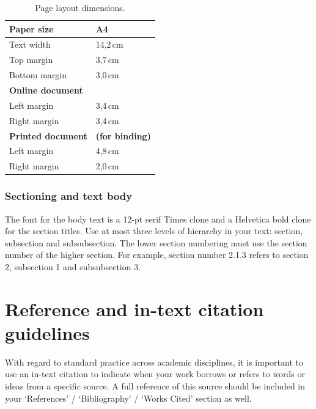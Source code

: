 \documentclass[english, 12pt, a4paper, elec, utf8, a-2b, online]{aaltothesis}
\begin{document}
\begin{table}[htb]
	\centering
	\caption{Page layout dimensions.}
	\label{tab:layout}
	\sffamily%
	\begin{tabular}{ll}
		\hline
		Paper size & A4\\\hline
		Text width & 14,2\,cm \\\hline
		Top margin & 3,7\,cm \\\hline
		Bottom margin & 3,0\,cm \\\hline
		\textbf{Online document} & \\\hline
		Left margin & 3,4\,cm \\\hline
		Right margin & 3,4\,cm \\\hline
		\textbf{Printed document} & \textbf{(for binding)} \\\hline
		Left margin & 4,8\,cm \\\hline
		Right margin & 2,0\,cm \\\hline
	\end{tabular}
\end{table}


\subsubsection*{Sectioning and text body}

The font for the body text is a 12-pt serif Times clone and a Helvetica bold 
clone for the section titles. Use at most three levels of hierarchy in your 
text: section, subsection and subsubsection. The lower section numbering must 
use the section number of the higher section. For example, section number 2.1.3 
refers to section 2, subsection 1 and subsubsection 3.

\clearpage
\section{Reference and in-text citation guidelines}
\label{app:reference}

With regard to standard practice across academic disciplines, it is important to
use an in-text citation to indicate when your work borrows or refers to words or
ideas from a specific source. A full reference of this source should be included
in your ‘References’ / ‘Bibliography’ / ‘Works Cited’ section as well.
\end{document}
